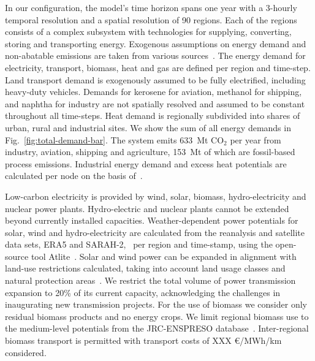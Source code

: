 \documentclass[twocolumn]{article}
\newcommand{\COtwo}{CO$_2$}
\begin{document}
%
In our configuration, the model's time horizon spans one year with a 3-hourly temporal resolution and a spatial resolution of 90 regions. Each of the regions consists of a complex subsystem with technologies for supplying, converting, storing and transporting energy. Exogenous assumptions on energy demand and non-abatable emissions are taken from various sources~\cite{piamanzGeoreferencedIndustrialSites2018,muehlenpfordtTimeSeries2019,mantzosJRCIDEES20152018,NationalEmissionsReported2023,EurostatCompleteEnergyBalance,uwekrienDemandlib2023}. The energy demand for electricity, transport, biomass, heat and gas are defined per region and time-step.
Land transport demand is exogenously assumed to be fully electrified, including heavy-duty vehicles.
Demands for kerosene for aviation, methanol for shipping, and naphtha for industry are not spatially resolved and assumed to be constant throughout all time-steps.
Heat demand is regionally subdivided into shares of urban, rural and industrial sites.
We show the sum of all energy demands in Fig.~\ref{fig:total-demand-bar}.
The system emits 633~Mt \COtwo{} per year from industry, aviation, shipping and agriculture, 153~Mt of which are fossil-based process emissions.
Industrial energy demand and excess heat potentials are calculated per node on the basis of~\cite{hotmaps_industrial_db}.


Low-carbon electricity is provided by wind, solar, biomass, hydro-electricity and nuclear power plants. Hydro-electric and nuclear plants cannot be extended beyond currently installed capacities. Weather-dependent power potentials for solar, wind and hydro-electricity are calculated from the reanalysis and satellite data sets, ERA5 and SARAH-2,~\cite{hersbachERA5GlobalReanalysis2020,pfeifrothSurfaceRadiationData2017} per region and time-stamp, using the open-source tool Atlite~\cite{hofmannAtliteLightweightPython2021}.
Solar and wind power can be expanded in alignment with land-use restrictions calculated, taking into account land usage classes and natural protection areas~\cite{eeaCorineLandCover2012,eeaNatura2000Data2016}. We restrict the total volume of power transmission expansion to 20\% of its current capacity, acknowledging the challenges in inaugurating new transmission projects.
For the use of biomass we consider only residual biomass products and no energy crops. We limit regional biomass use to the medium-level potentials from the JRC-ENSPRESO database~\cite{enspreso_database,instituteforenergyandtransportjointresearchcentreJRCEUTIMESModelBioenergy2015}. Inter-regional biomass transport is permitted with transport costs of XXX €/MWh/km considered.
\end{document}
